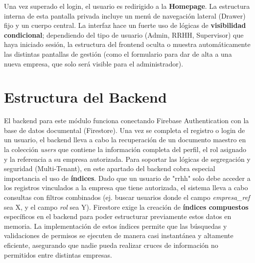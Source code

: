 Una vez superado el login, el usuario es redirigido a la \textbf{Homepage}. La estructura interna de esta pantalla privada incluye un menú de navegación lateral (Drawer) fijo y un cuerpo central. La interfaz hace un fuerte uso de lógicas de \textbf{visibilidad condicional}; dependiendo del tipo de usuario (Admin, RRHH, Supervisor) que haya iniciado sesión, la estructura del frontend oculta o muestra automáticamente las distintas pantallas de gestión (como el formulario para dar de alta a una nueva empresa, que solo será visible para el administrador).

\section{Estructura del Backend}
El backend para este módulo funciona conectando Firebase Authentication con la base de datos documental (Firestore). Una vez se completa el registro o login de un usuario, el backend lleva a cabo la recuperación de un documento maestro en la colección \textit{users} que contiene la información completa del perfil, el rol asignado y la referencia a su empresa autorizada.
Para soportar las lógicas de segregación y seguridad (Multi-Tenant), en este apartado del backend cobra especial importancia el uso de \textbf{índices}. Dado que un usuario de "rrhh" solo debe acceder a los registros vinculados a la empresa que tiene autorizada, el sistema lleva a cabo consultas con filtros combinados (ej. buscar usuarios donde el campo \textit{empresa\_ref} sea X, y el campo \textit{rol} sea Y). Firestore exige la creación de \textbf{índices compuestos} específicos en el backend para poder estructurar previamente estos datos en memoria. La implementación de estos índices permite que las búsquedas y validaciones de permisos se ejecuten de manera casi instantánea y altamente eficiente, asegurando que nadie pueda realizar cruces de información no permitidos entre distintas empresas.
